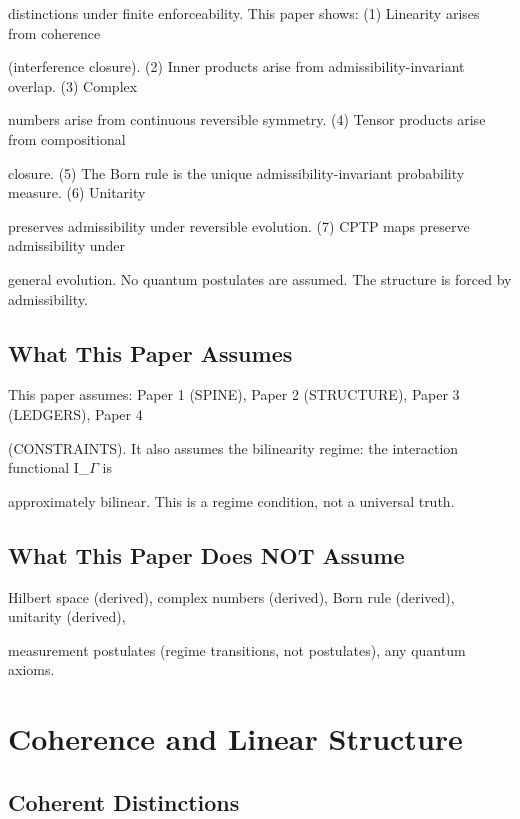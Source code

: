 \documentclass[11pt]{article}
\begin{document}
distinctions under finite enforceability. This paper shows: (1) Linearity arises from coherence

(interference closure). (2) Inner products arise from admissibility-invariant overlap. (3) Complex

numbers arise from continuous reversible symmetry. (4) Tensor products arise from compositional

closure. (5) The Born rule is the unique admissibility-invariant probability measure. (6) Unitarity

preserves admissibility under reversible evolution. (7) CPTP maps preserve admissibility under

general evolution. No quantum postulates are assumed. The structure is forced by admissibility.



\subsection{What This Paper Assumes}



This paper assumes: Paper 1 (SPINE), Paper 2 (STRUCTURE), Paper 3 (LEDGERS), Paper 4

(CONSTRAINTS). It also assumes the bilinearity regime: the interaction functional I_$\Gamma$ is

approximately bilinear. This is a regime condition, not a universal truth.



\subsection{What This Paper Does NOT Assume}

Hilbert space (derived), complex numbers (derived), Born rule (derived), unitarity (derived),

measurement postulates (regime transitions, not postulates), any quantum axioms.



\section{Coherence and Linear Structure}



\subsection{Coherent Distinctions}
\end{document}
